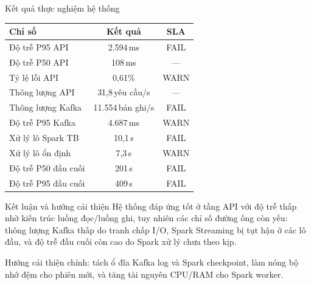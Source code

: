 \documentclass[serif, aspectratio=169]{beamer}
\begin{document}
\begin{frame}{Kết quả thực nghiệm hệ thống}
 \tableofcontents[sectionstyle=show,
 subsectionstyle=show/shaded/hide,
 subsubsectionstyle=show/shaded/hide]
    \vspace{-0.2cm}
    \begin{table}[h]
    \centering
    \begin{tabular}{lcc}
    \toprule
    \textbf{Chỉ số} & \textbf{Kết quả} & \textbf{SLA} \\
    \midrule
    Độ trễ P95 API      & 2.594\,ms & FAIL\\
    Độ trễ P50 API      & 108\,ms   & ---\\
    Tỷ lệ lỗi API       & 0,61\%    & WARN\\
    Thông lượng API     & 31,8\,yêu cầu/s & ---\\
    \midrule
    Thông lượng Kafka   & 11.554\,bản ghi/s & FAIL\\
    Độ trễ P95 Kafka    & 4.687\,ms & WARN\\
    \midrule
    Xử lý lô Spark TB    & 10,1\,s   & FAIL\\
    Xử lý lô ổn định     & 7,3\,s    & WARN\\
    \midrule
    Độ trễ P50 đầu cuối   & 201\,s    & FAIL\\
    Độ trễ P95 đầu cuối   & 409\,s    & FAIL\\
    \bottomrule
    \end{tabular}
    \end{table}

    \vspace{0.1cm}
\end{frame}

\begin{frame}{Kết luận và hướng cải thiện}
 \tableofcontents[sectionstyle=show,
 subsectionstyle=show/shaded/hide,
 subsubsectionstyle=show/shaded/hide]
    \vspace{-0.2cm}
    Hệ thống đáp ứng tốt ở tầng API với độ trễ thấp nhờ kiến trúc luồng đọc/luồng ghi, tuy nhiên các chỉ số đường ống còn yếu: thông lượng Kafka thấp do tranh chấp I/O, Spark Streaming bị tụt hậu ở các lô đầu, và độ trễ đầu cuối còn cao do Spark xử lý chưa theo kịp.

    \vspace{0.3cm}
    Hướng cải thiện chính: tách ổ đĩa Kafka log và Spark checkpoint, làm nóng bộ nhớ đệm cho phiên mới, và tăng tài nguyên CPU/RAM cho Spark worker.
\end{frame}
\end{document}
